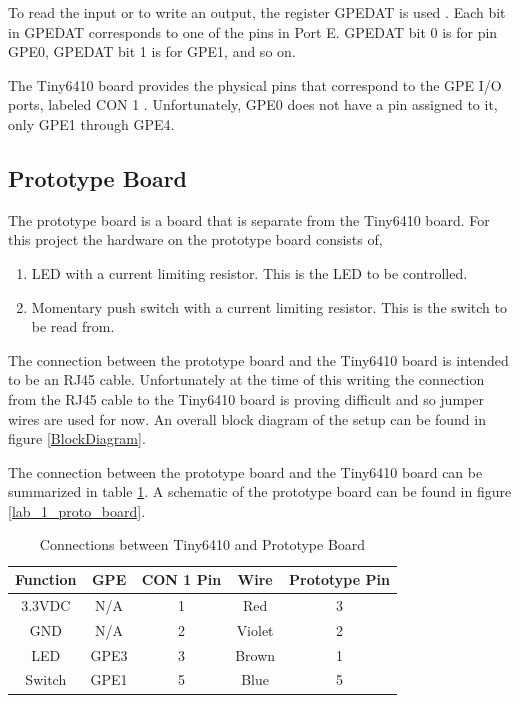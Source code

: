 \documentclass[12pt,conference]{IEEEtran}
\begin{document}
To read the input or to write an output, the register GPEDAT is used \cite{Samsung}.  Each bit in GPEDAT corresponds to one of the pins in Port E.  GPEDAT bit 0 is for pin GPE0, GPEDAT bit 1 is for GPE1, and so on. 

The Tiny6410 board provides the physical pins that correspond to the GPE I/O ports, labeled CON 1 \cite{HWHandout}. Unfortunately, GPE0 does not have a pin assigned to it, only GPE1 through GPE4.

\subsection{Prototype Board}\label{ProtoBoard}
The prototype board is a board that is separate from the Tiny6410 board. For this project the hardware on the prototype board consists of,
\begin{enumerate}
	\item LED with a current limiting resistor.  This is the LED to be controlled.
	\item Momentary push switch with a current limiting resistor. This is the switch to be read from.
\end{enumerate}
The connection between the prototype board and the Tiny6410 board is intended to be an RJ45 cable. Unfortunately at the time of this writing the connection from the RJ45 cable to the Tiny6410 board is proving difficult and so jumper wires are used for now. An overall block diagram of the setup can be found in figure \ref{BlockDiagram}.

The connection between the prototype board and the Tiny6410 board can be summarized in table \ref{Ta:connections}. A schematic of the prototype board can be found in figure \ref{lab_1_proto_board}.

\begin{table}[h]
\begin{tabular}{ | c | c | c | c | c | }
	\hline
	\textbf{Function} & \textbf{GPE} & \textbf{CON 1 Pin} & \textbf{Wire} & \textbf{Prototype Pin} \\ \hline
	3.3VDC	& N/A  & 1 & Red & 3 \\ \hline
	GND		& N/A  & 2 & Violet & 2 \\ \hline
	LED		& GPE3 & 3 & Brown & 1 \\ \hline
	Switch	& GPE1 & 5 & Blue  & 5 \\ \hline
\end{tabular}
\caption{Connections between Tiny6410 and Prototype Board}\label{Ta:connections}
\end{table}
\end{document}
